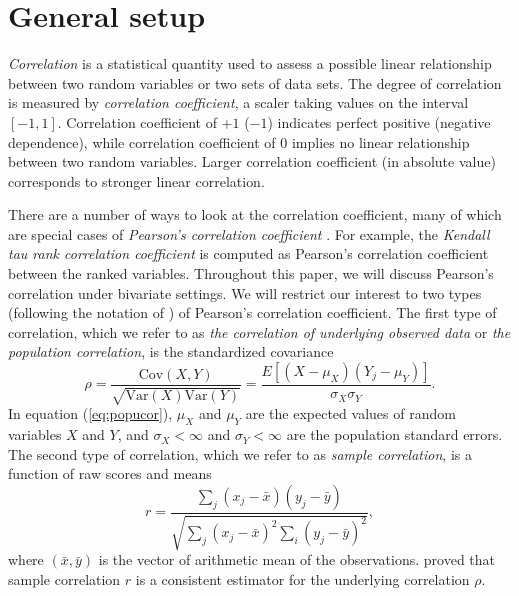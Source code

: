 \documentclass[12pt, a4paper]{article}
\newcommand{\cov}{\text{Cov}}
\newcommand{\var}{\text{Var}}
\newcommand{\samplecor}{sample correlation}
\newcommand{\popucor}{the correlation of underlying observed data}
\begin{document}
	
	
	
	\section{General setup}\label{subsec:generalsetup}
	\textit{Correlation} is a statistical quantity used to assess a possible linear relationship 
	between two random variables or two sets of data sets. The degree of correlation is measured by 
	\textit{correlation coefficient}, a scaler taking values on the interval $[-1, 1]$. Correlation 
	coefficient of $+1$ ($-1$) indicates perfect positive (negative dependence), while correlation 
	coefficient of 0 implies no linear relationship between two random variables. Larger 
	correlation coefficient (in absolute value) corresponds to stronger linear correlation. 
	
	There are a number of ways to look at the correlation coefficient, many of which are special 
	cases of \textit{Pearson's correlation coefficient} 
	\citep{lee1988thirteen}. For example, the \textit{Kendall tau rank correlation coefficient} is 
	computed as Pearson's correlation coefficient between the ranked variables. Throughout this 
	paper, we will discuss Pearson's correlation under bivariate settings. We will restrict our 
	interest to two types (following the notation of \citet{lee1988thirteen}) of Pearson's 
	correlation coefficient.  The first type of correlation, which we refer to as 
	\textit{\popucor} or \textit{the population correlation}, is the standardized 
	covariance
	\begin{equation}\label{eq:popucor}
	\rho =\dfrac{\cov(X, Y)}{\sqrt{\var(X)\var(Y)}} = 
	\dfrac{E[(X-\mu_X)(Y_j-\mu_Y)]}{\sigma_X\sigma_Y}.
	\end{equation} 
	In equation (\ref{eq:popucor}), $\mu_X$ and $\mu_Y$ are the expected values of 
	random variables 
	$X$ and 
	$Y$,  and $\sigma_X<\infty$ and 
	$\sigma_Y<\infty$ are the population standard errors. The second type of correlation, which we 
	refer to as \textit{\samplecor}, is a function of raw scores and means
	\begin{equation}\label{eq:samplecor}
	r  =  \dfrac{\sum_j (x_j -\bar{x})(y_j - \bar{y})}{\sqrt{\sum_{j}(x_j - \bar{x})^2\sum_i(y_j - 
			\bar{y})^2}}, 
	\end{equation}
	where $(\bar{x}, \bar{y})$ is the vector of arithmetic mean of the observations. 
	\citet{fisher1915frequency} proved that sample correlation $r$ is a consistent 
	estimator for the underlying correlation $\rho$.
	
\end{document}
